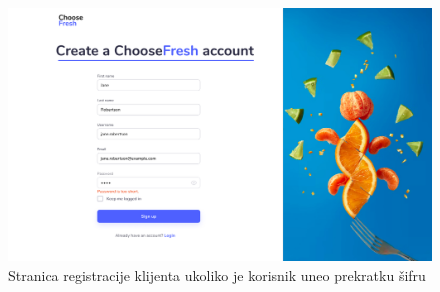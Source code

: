 \begin{figure}[H]
	\begin{center}
		\includegraphics[width=\textwidth]{UI/ShortPasswordSignUp.jpg}
    		\caption{Stranica registracije klijenta ukoliko je korisnik uneo prekratku šifru}
    \label{fig:ShortPassword}
    \end{center}
\end{figure}